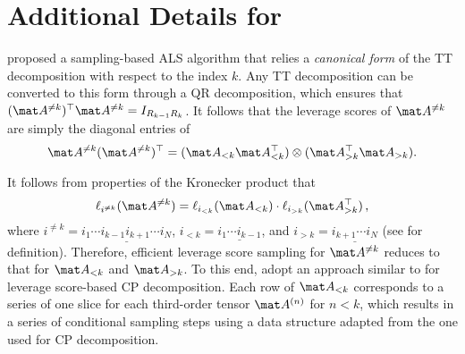 \section{Additional Details for }
\label{app:completion}

\citet{bharadwaj2024efficient} proposed a sampling-based ALS algorithm that relies a \emph{canonical form} of the TT decomposition with respect to the index $k$. Any TT decomposition can be converted to this form through a QR decomposition, which ensures that $(\mat A^{\neq k})^\top \mat A^{\neq k} = I_{R_{k-1} R_k}$.
It follows that the leverage scores of $\mat A^{\neq k}$ are simply the diagonal entries of 
\[
    \mat A^{\neq k} (\mat A^{\neq k})^\top = (\mat A_{< k}\mat A_{<k}^\top) \otimes (\mat A_{> k}^\top\mat A_{>k}).
\]

It follows from properties of the Kronecker product that
\[
    \ell_{i^{\neq k}}(\mat A^{\neq k})
    =
    \ell_{i_{< k}}(\mat A_{< k}) \cdot \ell_{i_{> k}}(\mat A^\top_{> k})\,,
\]
where $i^{\neq k} = \underline{i_1\cdots i_{k-1} i_{k+1}\cdots i_N}$, $i_{< k} = \underline{i_1\cdots i_{k-1}}$, and $i_{> k} = \underline{i_{k+1}\cdots i_N}$ (see  for definition).
Therefore, efficient leverage score sampling for $\mat A^{\neq k}$ reduces to that for $\mat A_{< k}$ and $\mat A_{> k}$.
To this end, \citet{bharadwaj2024efficient} adopt an approach similar to \citet{bharadwaj2023fast} for leverage score-based CP decomposition.
Each row of $\mat A_{< k}$ corresponds to a series of one slice for each third-order tensor $\mat A^{(n)}$ for $n<k$, which results in a series of conditional sampling steps using a data structure adapted from the one used for CP decomposition.
